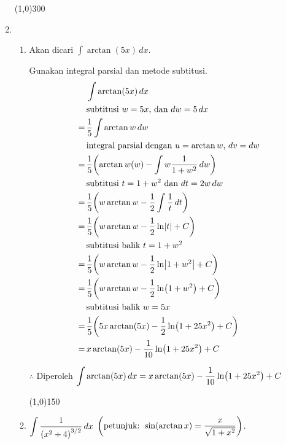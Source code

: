 \begin{enumerate}[leftmargin=*, label={\arabic*}.]
\begin{enumerate}[label={\alph*}.]
    \end{enumerate}

\begin{center}\line(1,0){300}\end{center}


\item 
    \begin{enumerate}[label={\alph*}.]
    \item Akan dicari $\int \arctan(5x)\,dx$.
    
    Gunakan integral parsial dan metode subtitusi.
    \begin{align*}
        &\int \arctan(5x)\,dx\\
        &\text{subtitusi $w=5x$, dan $dw=5\,dx$}\\
        =\,&\frac{1}{5}\int\arctan w\,dw\\
        &\text{integral parsial dengan $u = \arctan w$, $dv = dw$}\\
        =\,&\frac{1}{5}\brk*{\arctan w(w)-\int w \frac{1}{1+w^{2}}\,dw}\\
        &\text{subtitusi $t = 1+w^{2}$ dan $dt=2w\,dw$}\\
        =\,&\frac{1}{5}\brk*{w\arctan w-\frac{1}{2}\int \frac{1}{t}\,dt}\\
        =\,&\frac{1}{5}\brk*{w\arctan w-\frac{1}{2}\ln\abs{t}+C}\\
        &\text{subtitusi balik $t=1+w^{2}$}\\
        =\,&\frac{1}{5}\brk*{w\arctan w-\frac{1}{2}\ln\abs*{1+w^{2}}+C}\\
        =\,&\frac{1}{5}\brk*{w\arctan w-\frac{1}{2}\ln\brk*{1+w^{2}}+C}\\
        &\text{subtitusi balik $w=5x$}\\
        =\,&\frac{1}{5}\brk*{5x\arctan(5x)-\frac{1}{2}\ln\brk*{1+25x^{2}}+C}\\
        =\,&x\arctan(5x)-\frac{1}{10}\ln\brk*{1+25x^{2}}+C
    \end{align*}

    $\therefore$ Diperoleh 
    $\ds \int \arctan(5x)\,dx = x\arctan(5x)-\frac{1}{10}\ln\brk*{1+25x^{2}}+C$


\begin{center}\line(1,0){150}\end{center}


    \item $\ds \int \frac{1}{\brk*{x^{2}+4}^{3/2}}\,dx$ 
    $\ds\brk*{\text{petunjuk: } \sin(\arctan x) = \frac{x}{\sqrt{1+x^{2}}}}$.


\end{enumerate}
\end{enumerate}
